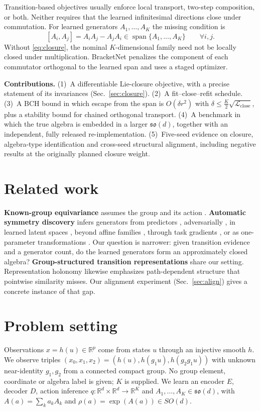 \documentclass[10pt]{article}
\newcommand{\so}{\mathfrak{so}}
\newcommand{\Lclose}{\mathcal{L}_{\mathrm{close}}}
\begin{document}
Transition-based objectives usually enforce local transport, two-step composition, or both. Neither requires that
the learned infinitesimal directions close under commutation. For learned generators $A_1,\dots,A_K$ the missing
condition is
\begin{equation}\label{eq:closure}
[A_i,A_j]=A_iA_j-A_jA_i\in\operatorname{span}\{A_1,\dots,A_K\}\qquad\forall i,j.
\end{equation}
Without \eqref{eq:closure}, the nominal $K$-dimensional family need not be locally closed under multiplication.
BracketNet penalizes the component of each commutator orthogonal to the learned span and uses a staged optimizer.

\textbf{Contributions.}
(1)~A differentiable Lie-closure objective, with a precise statement of its invariances (Sec.~\ref{sec:closure}).
(2)~A fit--close--refit schedule.
(3)~A BCH bound in which escape from the span is $O(\delta r^2)$ with $\delta\le\tfrac K2\sqrt{\Lclose}$, plus a
stability bound for chained orthogonal transport.
(4)~A benchmark in which the true algebra is embedded in a larger $\so(d)$, together with an independent, fully
released re-implementation.
(5)~Five-seed evidence on closure, algebra-type identification and cross-seed structural alignment, including
negative results at the originally planned closure weight.

\section{Related work}
\textbf{Known-group equivariance} assumes the group and its action \citep{cohen2016,bronstein2021}.
\textbf{Automatic symmetry discovery} infers generators from predictors \citep{dehmamy2021}, adversarially
\citep{yang2023}, in learned latent spaces \citep{yang2024}, beyond affine families \citep{shaw2024}, through task
gradients \citep{hu2024}, or as one-parameter transformations \citep{gabel2023}. Our question is narrower: given
transition evidence and a generator count, do the learned generators form an approximately closed algebra?
\textbf{Group-structured transition representations} \citep{park2022,keurti2023} share our setting. Representation
holonomy \citep{sevetlidis2026} likewise emphasizes path-dependent structure that pointwise similarity misses.
Our alignment experiment (Sec.~\ref{sec:align}) gives a concrete instance of that gap.

\section{Problem setting}
Observations $x=h(u)\in\mathbb R^p$ come from states $u$ through an injective smooth $h$. We observe triples
$(x_0,x_1,x_2)=(h(u),h(g_1u),h(g_2g_1u))$ with unknown near-identity $g_1,g_2$ from a connected compact group. No
group element, coordinate or algebra label is given; $K$ is supplied. We learn an encoder $E$, decoder $D$, action
inference $q:\mathbb R^d\times\mathbb R^d\to\mathbb R^K$ and $A_1,\dots,A_K\in\so(d)$, with
$A(a)=\sum_k a_kA_k$ and $\rho(a)=\exp(A(a))\in SO(d)$.
\end{document}
